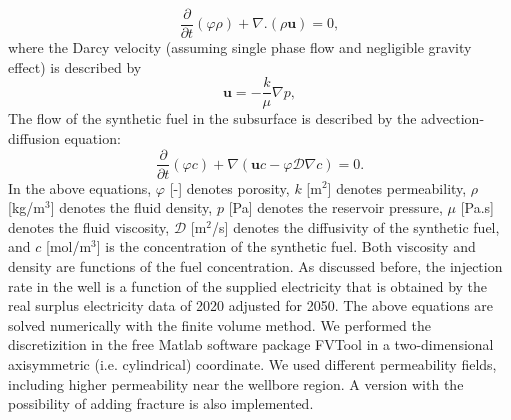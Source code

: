 \documentclass{ECOS_2021}
\begin{document}
\begin{equation}
\frac{\partial}{\partial t}\left(\varphi\rho\right)+\nabla.\left(\rho\mathbf{u}\right)=0,\label{eq:continuity}
\end{equation}
where the Darcy velocity (assuming single phase flow and negligible
gravity effect) is described by
\begin{equation}
\mathbf{u}=-\frac{k}{\mu}\nabla p,\label{eq:darcy}
\end{equation}
The flow of the synthetic fuel in the subsurface is described by the
advection-diffusion equation:
\begin{equation}
\frac{\partial}{\partial t}\left(\varphi c\right)+\nabla\left(\mathbf{u}c-\varphi\mathcal{D}\nabla c\right)=0.\label{eq:adv-diff-single}
\end{equation}
In the above equations, $\varphi$ {[}-{]} denotes porosity, $k$
{[}m$^{2}${]} denotes permeability, $\rho$ {[}kg/m$^{3}${]} denotes
the fluid density, $p$ {[}Pa{]} denotes the reservoir pressure, $\mu$
{[}Pa.s{]} denotes the fluid viscosity, $\mathcal{D}$ {[}m$^{2}$/s{]}
denotes the diffusivity of the synthetic fuel, and $c$ {[}mol/m$^{3}${]}
is the concentration of the synthetic fuel. Both viscosity and density
are functions of the fuel concentration. As discussed before, the
injection rate in the well is a function of the supplied electricity
that is obtained by the real surplus electricity data of 2020 adjusted
for 2050. The above equations are solved numerically with the finite
volume method. We performed the discretizition in the free Matlab
software package FVTool \cite{eftekhariFVToolFiniteVolume2015b} in
a two-dimensional axisymmetric (i.e. cylindrical) coordinate. We used
different permeability fields, including higher permeability near
the wellbore region. A version with the possibility of adding fracture
is also implemented.
\end{document}
